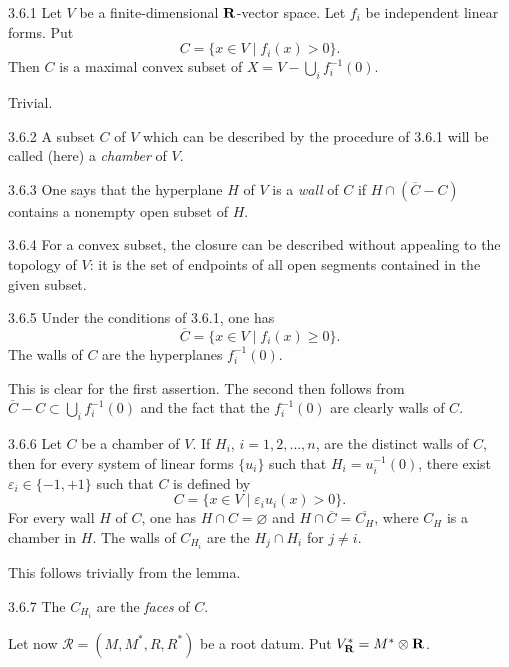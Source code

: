 \begin{lemma}{3.6.1}\label{XXI.3.6.1}
Let $V$ be a finite-dimensional $\mathbf{R}$-vector space.{\renewcommand{\thefootnote}{(14)}} Let $f_i$ be independent linear forms. Put
\[
C=\{x\in V\mid f_i(x)>0\}.
\]
Then $C$ is a maximal convex subset of $X=V-\bigcup_i f_i^{-1}(0)$.
\end{lemma}
Trivial.
\begin{definition}{3.6.2}\label{XXI.3.6.2}
A subset $C$ of $V$ which can be described by the procedure of 3.6.1 will be called (here) a \emph{chamber} of $V$.
\end{definition}
\begin{definition}{3.6.3}\label{XXI.3.6.3}
One says that the hyperplane $H$ of $V$ is a \emph{wall} of $C$ if $H\cap(\overline C-C)$ contains a nonempty open subset of $H$.
\end{definition}
\begin{remark}{3.6.4}\label{XXI.3.6.4}
For a convex subset, the closure can be described without appealing to the topology of $V$: it is the set of endpoints of all open segments contained in the given subset.
\end{remark}
\begin{lemma}{3.6.5}\label{XXI.3.6.5}
Under the conditions of 3.6.1, one has
\[
\overline C=\{x\in V\mid f_i(x)\geq0\}.
\]
The walls of $C$ are the hyperplanes $f_i^{-1}(0)$.
\end{lemma}
This is clear for the first assertion. The second then follows from $\overline C-C\subset\bigcup_i f_i^{-1}(0)$ and the fact that the $f_i^{-1}(0)$ are clearly walls of $C$.
\begin{proposition}{3.6.6}\label{XXI.3.6.6}
Let $C$ be a chamber of $V$. If $H_i$, $i=1,2,\ldots,n$, are the distinct walls of $C$, then for every system of linear forms $\{u_i\}$ such that $H_i=u_i^{-1}(0)$, there exist $\varepsilon_i\in\{-1,+1\}$ such that $C$ is defined by
\[
C=\{x\in V\mid\varepsilon_i u_i(x)>0\}.
\]
For every wall $H$ of $C$, one has $H\cap C=\varnothing$ and $H\cap\overline C=\overline{C_H}$, where $C_H$ is a chamber in $H$. The walls of $C_{H_i}$ are the $H_j\cap H_i$ for $j\ne i$.
\end{proposition}
This follows trivially from the lemma.
\begin{definition}{3.6.7}\label{XXI.3.6.7}
The $C_{H_i}$ are the \emph{faces} of $C$.
\end{definition}
Let now $\mathcal R=(M,M^*,R,R^*)$ be a root datum. Put $V_{\mathbf{R}}^*=M^*\otimes\mathbf{R}$.
